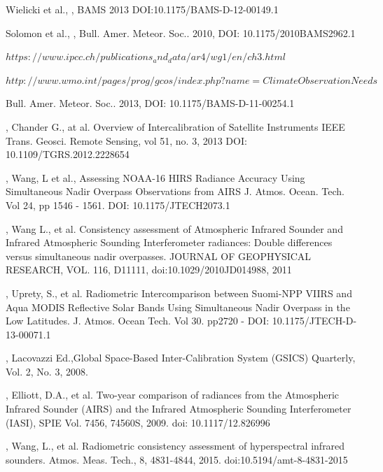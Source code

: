 \documentclass[twocolumn,10pt]{article}
\begin{document}
\begin{thebibliography}{9}

  Wielicki et al.,
  \emph{},
  BAMS 2013
  DOI:10.1175/BAMS-D-12-00149.1

  Solomon et al.,
  \emph{},
  Bull. Amer. Meteor. Soc.. 2010, 
  DOI: 10.1175/2010BAMS2962.1

 $ https://www.ipcc.ch/publications_and_data/ar4/wg1/en/ch3.html $

 $ http://www.wmo.int/pages/prog/gcos/index.php?name=ClimateObservationNeeds $

  Bull. Amer. Meteor. Soc.. 2013, 
  DOI: 10.1175/BAMS-D-11-00254.1

  \emph{},
  Chander G., at al.
  Overview of Intercalibration of Satellite Instruments
  IEEE Trans. Geosci. Remote Sensing, vol 51, no. 3, 2013
  DOI: 10.1109/TGRS.2012.2228654
  
  \emph{},
  Wang, L et al., 
  Assessing NOAA-16 HIRS Radiance Accuracy Using Simultaneous Nadir Overpass Observations from AIRS
  J. Atmos. Ocean. Tech. Vol 24, pp 1546 - 1561.
  DOI: 10.1175/JTECH2073.1

  \emph{},
  Wang L., et al. 
  Consistency assessment of Atmospheric Infrared Sounder and Infrared Atmospheric Sounding Interferometer radiances: Double differences versus simultaneous nadir overpasses.
 JOURNAL OF GEOPHYSICAL RESEARCH, VOL. 116, D11111,
 doi:10.1029/2010JD014988, 2011

  \emph{},
  Uprety, S., et al. 
  Radiometric Intercomparison between Suomi-NPP VIIRS and Aqua MODIS Reflective Solar Bands Using   Simultaneous Nadir Overpass in the Low Latitudes.
  J. Atmos. Ocean Tech. Vol 30. pp2720 - 
  DOI: 10.1175/JTECH-D-13-00071.1

  \emph{},
  Lacovazzi Ed.,Global Space-Based Inter-Calibration System (GSICS) Quarterly,
  Vol. 2, No. 3, 2008.

  \emph{},
  Elliott, D.A., et al.
  Two-year comparison of radiances from the Atmospheric Infrared Sounder (AIRS) and the Infrared Atmospheric Sounding Interferometer (IASI),
  SPIE Vol. 7456, 74560S, 2009.
  doi: 10.1117/12.826996

  \emph{},
  Wang, L., et al. Radiometric consistency assessment of hyperspectral infrared sounders.
  Atmos. Meas. Tech., 8, 4831-4844, 2015.
  doi:10.5194/amt-8-4831-2015


\end{thebibliography}
\end{document}

